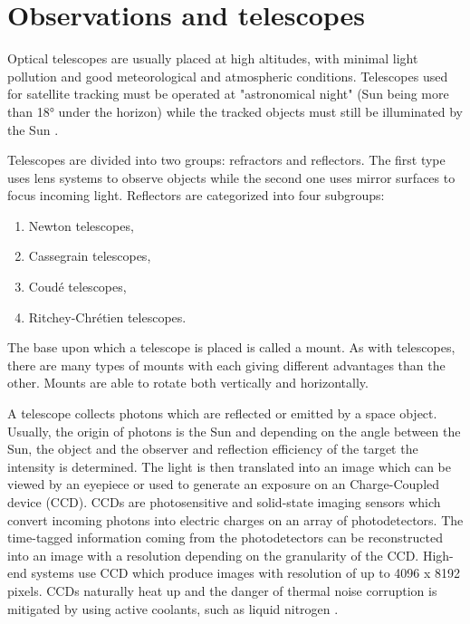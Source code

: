 \section{Observations and telescopes}\label{sec:observations_telescopes}

Optical telescopes are usually placed at high altitudes, with minimal light pollution and good meteorological and atmospheric conditions. Telescopes used for satellite tracking must be operated at "astronomical night" (Sun being more than 18° under the horizon) while the tracked objects must still be illuminated by the Sun \citep{klinkrad2006space}.

	Telescopes are divided into two groups: refractors and reflectors. The first type uses lens systems to observe objects while the second one uses mirror surfaces to focus incoming light. Reflectors are categorized into four subgroups:
	
\begin{enumerate}
	\item Newton telescopes,
	\item Cassegrain telescopes,
	\item Coudé telescopes,
	\item Ritchey-Chrétien telescopes.
\end{enumerate}
	
	The base upon which a telescope is placed is called a mount. As with telescopes, there are many types of mounts with each giving different advantages than the other. Mounts are able to rotate both vertically and horizontally.
	
	A telescope collects photons which are reflected or emitted by a space object. Usually, the origin of photons is the Sun and depending on the angle between the Sun, the object and the observer and reflection efficiency of the target the intensity is determined. The light is then translated into an image which can be viewed by an eyepiece or used to generate an exposure on an Charge-Coupled device (CCD). CCDs are photosensitive and solid-state imaging sensors which convert incoming photons into electric charges on an array of photodetectors. The time-tagged information coming from the photodetectors can be reconstructed into an image with a resolution depending on the granularity of the CCD. High-end systems use CCD which produce images with resolution of up to 4096 x 8192 pixels. CCDs naturally heat up and the danger of thermal noise corruption is mitigated by using active coolants, such as liquid nitrogen \citep{klinkrad2006space}.

